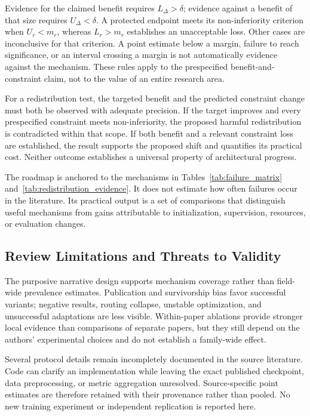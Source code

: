 \documentclass[5p,times,authoryear]{elsarticle}
\begin{document}
Evidence for the claimed benefit requires $L_\Delta>\delta$; evidence against a benefit of that size requires $U_\Delta<\delta$. A protected endpoint meets its non-inferiority criterion when $U_r<m_r$, whereas $L_r>m_r$ establishes an unacceptable loss. Other cases are inconclusive for that criterion. A point estimate below a margin, failure to reach significance, or an interval crossing a margin is not automatically evidence against the mechanism. These rules apply to the prespecified benefit-and-constraint claim, not to the value of an entire research area.

For a redistribution test, the targeted benefit and the predicted constraint change must both be observed with adequate precision. If the target improves and every prespecified constraint meets non-inferiority, the proposed harmful redistribution is contradicted within that scope. If both benefit and a relevant constraint loss are established, the result supports the proposed shift and quantifies its practical cost. Neither outcome establishes a universal property of architectural progress.

The roadmap is anchored to the mechanisms in Tables~\ref{tab:failure_matrix} and~\ref{tab:redistribution_evidence}. It does not estimate how often failures occur in the literature. Its practical output is a set of comparisons that distinguish useful mechanisms from gains attributable to initialization, supervision, resources, or evaluation changes.

\subsection{Review Limitations and Threats to Validity}
\label{subsec:limitations}

The purposive narrative design supports mechanism coverage rather than field-wide prevalence estimates. Publication and survivorship bias favor successful variants; negative results, routing collapse, unstable optimization, and unsuccessful adaptations are less visible. Within-paper ablations provide stronger local evidence than comparisons of separate papers, but they still depend on the authors' experimental choices and do not establish a family-wide effect.

Several protocol details remain incompletely documented in the source literature. Code can clarify an implementation while leaving the exact published checkpoint, data preprocessing, or metric aggregation unresolved. Source-specific point estimates are therefore retained with their provenance rather than pooled. No new training experiment or independent replication is reported here.
\end{document}
